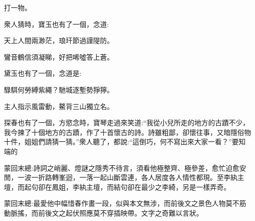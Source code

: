 \begin{parag}
    打一物。
\end{parag}


\begin{parag}
    衆人猜時，寶玉也有了一個，念道:
\end{parag}


\begin{poem}
    \begin{pl}天上人間兩渺茫，琅玕節過謹隄防。\end{pl}

    \begin{pl}鸞音鶴信須凝睇，好把唏噓答上蒼。\end{pl}

\end{poem}


\begin{parag}
    黛玉也有了一個，念道是:
\end{parag}


\begin{poem}
    \begin{pl}騄駬何勞縛紫繩？馳城逐塹勢猙獰。\end{pl}

    \begin{pl}主人指示風雷動，鰲背三山獨立名。\end{pl}

\end{poem}


\begin{parag}
    探春也有了一個，方慾念時，寶琴走過來笑道:“我從小兒所走的地方的古蹟不少，我今揀了十個地方的古蹟，作了十首懷古的詩。詩雖粗鄙，卻懷往事，又暗隱俗物十件，姐姐們請猜一猜。”衆人聽了，都說:“這倒巧，何不寫出來大家一看？”要知端的
\end{parag}


\begin{parag}
    \begin{note}蒙回末總:詩詞之峭麗、燈謎之隱秀不待言，須看他極整齊、極參差，愈忙迫愈安閒，一波一折路轉峯迴，一落一起山斷雲連，各人居度各人情性都現。至李紈主壇，而起句卻在鳳姐，李紈主壇，而結句卻在最少之李綺，另是一樣弄奇。\end{note}
\end{parag}


\begin{parag}
    \begin{note}蒙回末總:最愛他中幅惜春作畫一段，似與本文無涉，而前後文之景色人物莫不筋動脈搖，而前後文之起伏照應莫不穿插映帶。文字之奇難以言狀。\end{note}
\end{parag}

